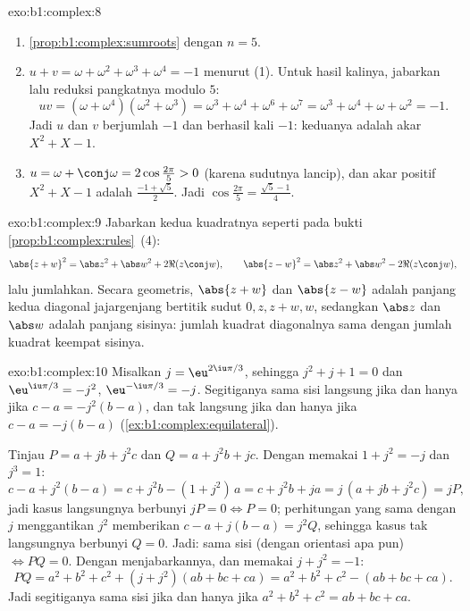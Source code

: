 \begin{solution}{exo:b1:complex:8}
\begin{enumerate}
  \item \cref{prop:b1:complex:sumroots} dengan $n = 5$.
  \item $u + v = \omega + \omega^2 + \omega^3 + \omega^4 = -1$ menurut (1).
        Untuk hasil kalinya, jabarkan lalu reduksi pangkatnya modulo $5$:
        \[
        uv = (\omega + \omega^4)(\omega^2 + \omega^3)
        = \omega^3 + \omega^4 + \omega^6 + \omega^7
        = \omega^3 + \omega^4 + \omega + \omega^2 = -1 .
        \]
        Jadi $u$ dan $v$ berjumlah $-1$ dan berhasil kali $-1$: keduanya
        adalah akar $X^2 + X - 1$.
  \item $u = \omega + \conj\omega = 2\cos\frac{2\pi}{5} > 0$ (karena
        sudutnya lancip), dan akar positif $X^2 + X - 1$ adalah
        $\frac{-1 + \sqrt 5}{2}$. Jadi $\cos\frac{2\pi}{5} =
        \frac{\sqrt 5 - 1}{4}$.
\end{enumerate}
\end{solution}

\begin{solution}{exo:b1:complex:9}
Jabarkan kedua kuadratnya seperti pada bukti
\cref{prop:b1:complex:rules}~(4):
\[
\abs{z + w}^2 = \abs z^2 + \abs w^2 + 2\Re(z\conj w),
\qquad
\abs{z - w}^2 = \abs z^2 + \abs w^2 - 2\Re(z\conj w),
\]
lalu jumlahkan. Secara geometris, $\abs{z+w}$ dan $\abs{z-w}$ adalah panjang
kedua diagonal jajargenjang bertitik sudut $0, z, z+w, w$,
sedangkan $\abs z$ dan $\abs w$ adalah panjang sisinya: jumlah
kuadrat diagonalnya sama dengan jumlah kuadrat keempat
sisinya.
\end{solution}

\begin{solution}{exo:b1:complex:10}
Misalkan $j = \eu^{2\iu\pi/3}$, sehingga $j^2 + j + 1 = 0$ dan $\eu^{\iu\pi/3} =
-j^2$, $\eu^{-\iu\pi/3} = -j$. Segitiganya sama sisi langsung jika dan hanya jika
$c - a = -j^2 (b - a)$, dan tak langsung jika dan hanya jika $c - a = -j(b - a)$
(\cref{ex:b1:complex:equilateral}).

Tinjau $P = a + jb + j^2 c$ dan $Q = a + j^2 b + jc$. Dengan memakai $1 +
j^2 = -j$ dan $j^3 = 1$:
\[
c - a + j^2(b - a) = c + j^2 b - (1 + j^2)\,a = c + j^2 b + ja
= j\,(a + jb + j^2 c) = jP,
\]
jadi kasus langsungnya berbunyi $jP = 0 \iff P = 0$; perhitungan yang sama
dengan $j$ menggantikan $j^2$ memberikan $c - a + j(b - a) = j^2 Q$, sehingga
kasus tak langsungnya berbunyi $Q = 0$. Jadi: sama sisi (dengan orientasi apa pun)
$\iff PQ = 0$. Dengan menjabarkannya, dan memakai $j + j^2 = -1$:
\[
PQ = a^2 + b^2 + c^2 + (j + j^2)(ab + bc + ca)
= a^2 + b^2 + c^2 - (ab + bc + ca).
\]
Jadi segitiganya sama sisi jika dan hanya jika $a^2 + b^2 + c^2 = ab +
bc + ca$.
\end{solution}

